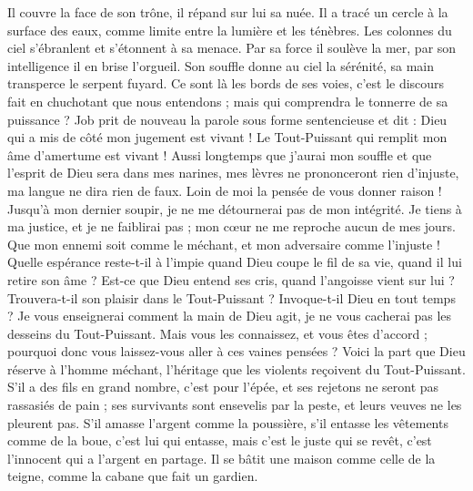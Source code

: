 \begin{multicols}{2}
Il couvre la face de son trône, il répand sur lui sa nuée.
Il a tracé un cercle à la surface des eaux, comme limite entre la lumière et les ténèbres.
Les colonnes du ciel s'ébranlent et s'étonnent à sa menace.
Par sa force il soulève la mer, par son intelligence il en brise l'orgueil.
Son souffle donne au ciel la sérénité, sa main transperce le serpent fuyard.
Ce sont là les bords de ses voies, c'est le discours fait en chuchotant que nous entendons ; mais qui comprendra le tonnerre de sa puissance ?
\VerseOne{}Job prit de nouveau la parole sous forme sentencieuse et dit :
Dieu qui a mis de côté mon jugement est vivant ! Le Tout-Puissant qui remplit mon âme d'amertume est vivant !
Aussi longtemps que j'aurai mon souffle et que l'esprit de Dieu sera dans mes narines,
mes lèvres ne prononceront rien d'injuste, ma langue ne dira rien de faux.
Loin de moi la pensée de vous donner raison ! Jusqu'à mon dernier soupir, je ne me détournerai pas de mon intégrité.
Je tiens à ma justice, et je ne faiblirai pas ; mon cœur ne me reproche aucun de mes jours.
Que mon ennemi soit comme le méchant, et mon adversaire comme l'injuste !
Quelle espérance reste-t-il à l'impie quand Dieu coupe le fil de sa vie, quand il lui retire son âme ?
Est-ce que Dieu entend ses cris, quand l'angoisse vient sur lui ?
Trouvera-t-il son plaisir dans le Tout-Puissant ? Invoque-t-il Dieu en tout temps ?
Je vous enseignerai comment la main de Dieu agit, je ne vous cacherai pas les desseins du Tout-Puissant.
Mais vous les connaissez, et vous êtes d'accord ; pourquoi donc vous laissez-vous aller à ces vaines pensées ?
Voici la part que Dieu réserve à l'homme méchant, l'héritage que les violents reçoivent du Tout-Puissant.
S'il a des fils en grand nombre, c'est pour l'épée, et ses rejetons ne seront pas rassasiés de pain ;
ses survivants sont ensevelis par la peste, et leurs veuves ne les pleurent pas.
S'il amasse l'argent comme la poussière, s'il entasse les vêtements comme de la boue,
c'est lui qui entasse, mais c'est le juste qui se revêt, c'est l'innocent qui a l'argent en partage.
Il se bâtit une maison comme celle de la teigne, comme la cabane que fait un gardien.

\end{multicols}
